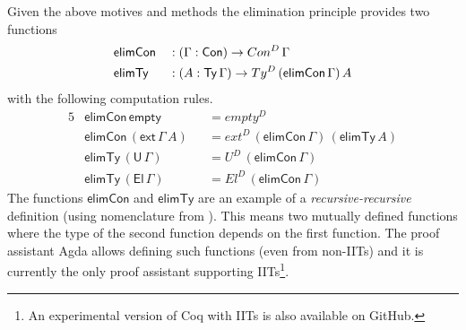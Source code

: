 \documentclass[a4paper,UKenglish,cleveref, autoref]{lipics-v2019}
\begin{document}
Given the above motives and methods the elimination principle provides
two functions
\begin{alignat*}{5}
  & \mathsf{elimCon} && : (\Gamma:\mathsf{Con})\rightarrow Con^D\,\Gamma \\
  & \mathsf{elimTy} && : (A:\mathsf{Ty}\,\Gamma)\rightarrow Ty^D\,(\mathsf{elimCon}\,\Gamma)\,A
\end{alignat*}
with the following computation rules.
\begin{alignat*}{5}
  & \mathsf{elimCon}\,\mathsf{empty} && = {empty}^D \\
  & \mathsf{elimCon}\,(\mathsf{ext}\,\Gamma\,A) && = {ext}^D\,(\mathsf{elimCon}\,\Gamma)\,(\mathsf{elimTy}\,A) \\
  & \mathsf{elimTy}\,(\mathsf{U}\,\Gamma) && = U^D\,(\mathsf{elimCon}\,\Gamma) \\
  & \mathsf{elimTy}\,(\mathsf{El}\,\Gamma) && = El^D\,(\mathsf{elimCon}\,\Gamma)
\end{alignat*}
The functions $\mathsf{elimCon}$ and $\mathsf{elimTy}$ are an example
of a \emph{recursive-recursive} definition (using nomenclature from
\cite{forsberg-phd}). This means two mutually defined functions where
the type of the second function depends on the first function. The
proof assistant Agda \cite{norell07thesis} allows defining such
functions (even from non-IITs) and it is currently the only proof
assistant supporting IITs\footnote{An experimental version of Coq with
  IITs is also available on GitHub.}.
\end{document}
